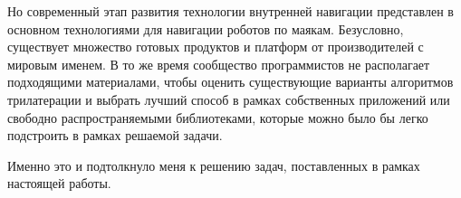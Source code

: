 Но современный этап развития технологии внутренней навигации представлен в основном технологиями для навигации роботов по маякам. Безусловно, существует множество готовых продуктов и платформ от производителей с мировым именем. В то же время сообщество программистов не располагает подходящими материалами, чтобы оценить существующие варианты алгоритмов трилатерации и выбрать лучший способ в рамках собственных приложений или свободно распространяемыми библиотеками, которые можно было бы легко подстроить в рамках решаемой задачи.

Именно это и подтолкнуло меня к решению задач, поставленных в рамках настоящей работы.